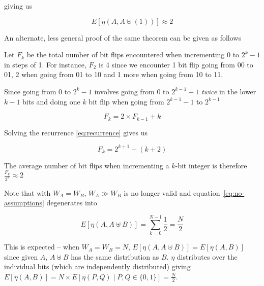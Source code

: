 \begin{enumerate}
    giving us

    \begin{equation}
      \label{eq:average-flips}
      E[\eta(A, A \uplus (1))] \approx 2
    \end{equation}

    An alternate, less general proof of the same theorem can be given
    as follows

    \begin{adjustwidth}{2.5em}{0pt}

    Let $F_k$ be the total number of bit flips encountered when
    incrementing 0 to $2^k - 1$ in steps of 1.  For instance, $F_2$ is 4
    since we encounter 1 bit flip going from 00 to 01, 2 when going from
    01 to 10 and 1 more when going from 10 to 11.

    Since going from 0 to $2^k - 1$ involves going from 0 to $2^{k - 1} -
    1$ \textit{twice} in the lower $k - 1$ bits and doing one $k$ bit flip
    when going from $2^{k - 1} - 1$ to $2^{k - 1}$


    \begin{equation} \label{eq:recurrence}
      F_k = 2 \times F_{k - 1} + k
    \end{equation}

    Solving the recurrence \ref{eq:recurrence} gives us

    \begin{equation} \label{eq:solved}
      F_k = 2^{k + 1} - (k + 2)
    \end{equation}

    The average number of bit flips when incrementing a $k$-bit integer is
    therefore $\frac{F_k}{2^k} \approx 2$

    \end{adjustwidth}

\end{enumerate}

Note that with $W_A = W_B$, $W_A \gg W_B$ is no longer valid and
equation~\ref{eq:no-assumptions} degenerates into

\begin{equation}
  E[\eta(A, A \uplus B)] = \displaystyle\sum\limits_{k=0}^{N - 1} \frac{1}{2} =
  \frac{N}{2}
\end{equation}

This is expected -- when $W_A = W_B = N$, $E[\eta(A, A \uplus B)] =
E[\eta(A, B)]$ since given $A$, $A \uplus B$ has the same distribution as
$B$.  $\eta$ distributes over the individual bits (which are
independently distributed) giving $E[\eta(A, B)] = N \times E[\eta(P,
  Q) \mid P, Q \in \{0, 1\}] = \frac{N}{2}$.
 
